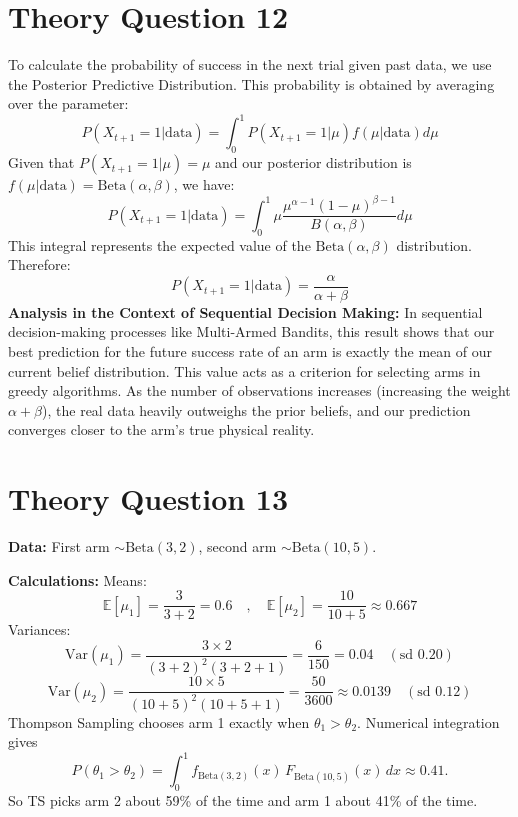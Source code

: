 \documentclass[12pt,a4paper]{article}
\begin{document}
\section*{Theory Question 12} %
To calculate the probability of success in the next trial given past data, we use the Posterior Predictive Distribution.
This probability is obtained by averaging over the parameter: %
\[ 
P(X_{t+1} = 1 | \text{data}) = \int_{0}^{1} P(X_{t+1} = 1 | \mu) f(\mu | \text{data}) d\mu 
\] %
Given that $P(X_{t+1} = 1 | \mu) = \mu$ and our posterior distribution is $f(\mu | \text{data}) = \mathrm{Beta}(\alpha, \beta)$, we have: %
\[ 
P(X_{t+1} = 1 | \text{data}) = \int_{0}^{1} \mu \frac{\mu^{\alpha-1}(1-\mu)^{\beta-1}}{B(\alpha, \beta)} d\mu 
\] %
This integral represents the expected value of the $\mathrm{Beta}(\alpha, \beta)$ distribution.
Therefore: %
\[ 
P(X_{t+1} = 1 | \text{data}) = \frac{\alpha}{\alpha+\beta} 
\] %
\textbf{Analysis in the Context of Sequential Decision Making:} %
In sequential decision-making processes like Multi-Armed Bandits, this result shows that our best prediction for the future success rate of an arm is exactly the mean of our current belief distribution.
This value acts as a criterion for selecting arms in greedy algorithms.
As the number of observations increases (increasing the weight $\alpha+\beta$), the real data heavily outweighs the prior beliefs, and our prediction converges closer to the arm's true physical reality.
%

\section*{Theory Question 13} %
\textbf{Data:} %
First arm $\sim \mathrm{Beta}(3, 2)$, second arm $\sim \mathrm{Beta}(10, 5)$.

\textbf{Calculations:} %
Means: %
\[ 
\mathbb{E}[\mu_1] = \frac{3}{3+2} = 0.6 \quad , \quad \mathbb{E}[\mu_2] = \frac{10}{10+5} \approx 0.667 
\] %
Variances: %
\[ 
\mathrm{Var}(\mu_1) = \frac{3 \times 2}{(3+2)^2(3+2+1)} = \frac{6}{150} = 0.04 \quad (\text{sd } 0.20)
\] %
\[ 
\mathrm{Var}(\mu_2) = \frac{10 \times 5}{(10+5)^2(10+5+1)} = \frac{50}{3600} \approx 0.0139 \quad (\text{sd } 0.12)
\] %
Thompson Sampling chooses arm 1 exactly when $\theta_1 > \theta_2$. Numerical integration gives
\[
P(\theta_1 > \theta_2) = \int_0^1 f_{\mathrm{Beta}(3,2)}(x)\,F_{\mathrm{Beta}(10,5)}(x)\,dx \approx 0.41 .
\]
So TS picks arm 2 about 59\% of the time and arm 1 about 41\% of the time.
\end{document}
